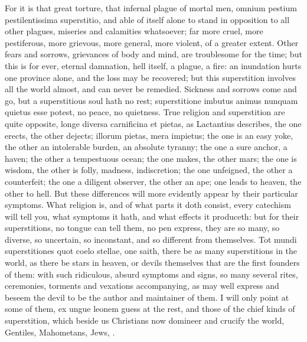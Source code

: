 {For it is that great torture, that infernal plague of mortal men,
omnium pestium pestilentissima superstitio, and able of itself alone to
stand in opposition to all other plagues, miseries and calamities
whatsoever; far more cruel, more pestiferous, more grievous, more
general, more violent, of a greater extent. Other fears and sorrows,
grievances of body and mind, are troublesome for the time; but this is
for ever, eternal damnation, hell itself, a plague, a fire: an
inundation hurts one province alone, and the loss may be recovered; but
this superstition involves all the world almost, and can never be
remedied. Sickness and sorrows come and go, but a superstitious soul
hath no rest; superstitione imbutus animus nunquam quietus esse
potest, no peace, no quietness. True religion and superstition are
quite opposite, longe diversa carnificina et pietas, as Lactantius
describes, the one erects, the other dejects; illorum pietas, mera
impietus; the one is an easy yoke, the other an intolerable burden, an
absolute tyranny; the one a sure anchor, a haven; the other a
tempestuous ocean; the one makes, the other mars; the one is wisdom,
the other is folly, madness, indiscretion; the one unfeigned, the other
a counterfeit; the one a diligent observer, the other an ape; one leads
to heaven, the other to hell. But these differences will more evidently
appear by their particular symptoms. What religion is, and of what
parts it doth consist, every catechism will tell you, what symptoms it
hath, and what effects it produceth: but for their superstitions, no
tongue can tell them, no pen express, they are so many, so diverse, so
uncertain, so inconstant, and so different from themselves. Tot mundi
superstitiones quot coelo stellae, one saith, there be as many
superstitions in the world, as there be stars in heaven, or devils
themselves that are the first founders of them: with such ridiculous,
absurd symptoms and signs, so many several rites, ceremonies, torments
and vexations accompanying, as may well express and beseem the devil to
be the author and maintainer of them. I will only point at some of
them, ex ungue leonem guess at the rest, and those of the chief kinds
of superstition, which beside us Christians now domineer and crucify
the world, Gentiles, Mahometans, Jews, \etc{}.

}
